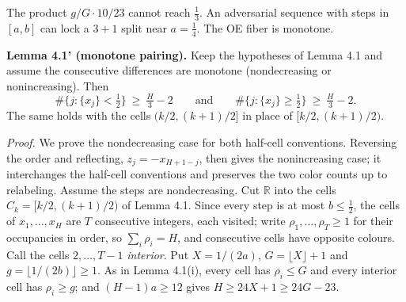 \documentclass[11pt,a4paper]{article}
\begin{document}
The product \(g/G\cdot 10/23\) cannot reach \(\tfrac13\). An adversarial
sequence with steps in \([a,b]\) can lock a \(3+1\) split near
\(a=\tfrac14\). The OE fiber is monotone.

\textbf{Lemma 4.1' (monotone pairing).} Keep the hypotheses of Lemma 4.1
and assume the consecutive differences are monotone (nondecreasing or
nonincreasing). Then \[
\#\{j:\{x_j\}<\tfrac12\}\ \ge\ \tfrac H3-2
\qquad\text{and}\qquad
\#\{j:\{x_j\}\ge\tfrac12\}\ \ge\ \tfrac H3-2.
\] The same holds with the cells \((k/2,(k+1)/2]\) in place of
\([k/2,(k+1)/2)\).

\emph{Proof.} We prove the nondecreasing case for both half-cell
conventions. Reversing the order and reflecting, \(z_j=-x_{H+1-j}\),
then gives the nonincreasing case; it interchanges the half-cell
conventions and preserves the two color counts up to relabeling. Assume
the steps are nondecreasing. Cut \(\mathbb R\) into the cells
\(C_k=[k/2,(k+1)/2)\) of Lemma 4.1. Since every step is at most
\(b\le\tfrac12\), the cells of \(x_1,\dots,x_H\) are \(T\) consecutive
integers, each visited; write \(\rho_1,\dots,\rho_T\ge 1\) for their
occupancies in order, so \(\sum_i\rho_i=H\), and consecutive cells have
opposite colours. Call the cells \(2,\dots,T-1\) \emph{interior}. Put
\(X=1/(2a)\), \(G=\lfloor X\rfloor+1\) and
\(g=\lfloor 1/(2b)\rfloor\ge 1\). As in Lemma 4.1(i), every cell has
\(\rho_i\le G\) and every interior cell has \(\rho_i\ge g\); and
\((H-1)a\ge 12\) gives \(H\ge 24X+1\ge 24G-23\).
\end{document}
